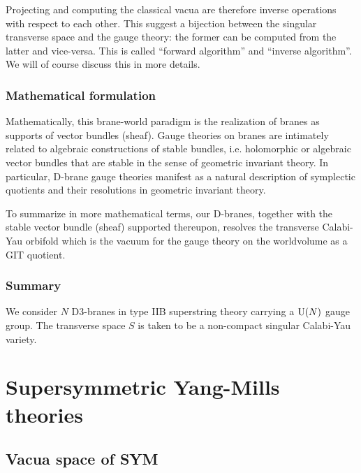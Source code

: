         Projecting and computing the classical vacua are therefore inverse operations with respect to each other. This suggest a bijection between the singular transverse space and the gauge theory: the former can be computed from the latter and vice-versa. This is called ``forward algorithm'' and ``inverse algorithm''. We will of course discuss this in more details.

    \subsubsection*{Mathematical formulation}

        Mathematically, this brane-world paradigm is the realization of branes as supports of vector bundles (sheaf). Gauge theories on branes are intimately related to algebraic constructions of stable bundles, i.e. holomorphic or algebraic vector bundles that are stable in the sense of geometric invariant theory. In particular, D-brane gauge theories manifest as a natural description of symplectic quotients and their resolutions in geometric invariant theory.

        To summarize in more mathematical terms, our D-branes, together with the stable vector bundle (sheaf) supported thereupon, resolves the transverse Calabi-Yau orbifold which is the vacuum for the gauge theory on the worldvolume as a GIT quotient. 

    \subsubsection*{Summary}

        We consider $N$ D$3$-branes in type IIB superstring theory carrying a $\text{U}(N)$ gauge group. The transverse space $S$ is taken to be a non-compact singular Calabi-Yau variety.

\section{Supersymmetric Yang-Mills theories}

    \subsection{Vacua space of SYM}

